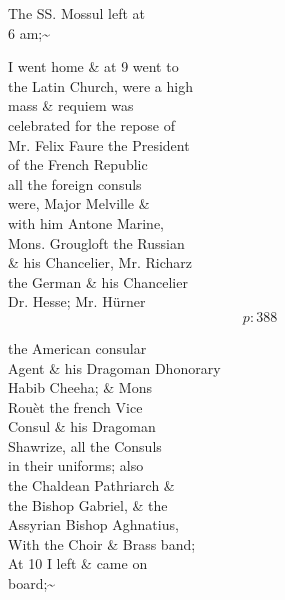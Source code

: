 \documentclass{report}
\begin{document}
	\par{
 	The SS. Mossul left at\ \\6 am;\~{}\ \\
	}

	\par{
 	I went home \& at 9 went to\ \\the Latin Church, were a high\ \\mass \& requiem was\ \\celebrated for the repose of\ \\Mr. Felix Faure the President\ \\of the French Republic\ \\all the foreign consuls\ \\were, Major Melville \&\ \\with him Antone Marine,\ \\Mons. Grougloft the Russian\ \\\& his Chancelier, Mr. Richarz\ \\the German \& his Chancelier\ \\Dr. Hesse; Mr. Hürner\ \\
  \[p: 388 \]

	}




	\par{
 	the American consular\ \\Agent \& his Dragoman Dhonorary\ \\Habib Cheeha; \& Mons\ \\Rouèt the french Vice\ \\Consul \& his Dragoman\ \\Shawrize, all the Consuls\ \\in their uniforms; also\ \\the Chaldean Pathriarch \&\ \\the Bishop Gabriel, \& the\ \\Assyrian Bishop Aghnatius,\ \\With the Choir \& Brass band;\ \\At 10 I left \& came on\ \\board;\~{}\ \\
	}
\end{document}
